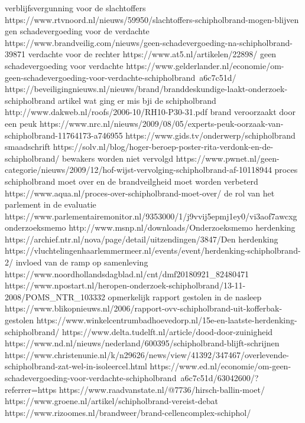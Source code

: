verblijfsvergunning voor de slachtoffers
https://www.rtvnoord.nl/nieuws/59950/slachtoffers-schipholbrand-mogen-blijven
gen schadevergoeding voor de verdachte
https://www.brandveilig.com/nieuws/geen-schadevergoeding-na-schipholbrand-39871
verdachte voor de rechter
https://www.at5.nl/artikelen/22898/
geen schadevergoeding voor verdachte
https://www.gelderlander.nl/economie/om-geen-schadevergoeding-voor-verdachte-schipholbrand~a6c7c51d/
https://beveiligingnieuws.nl/nieuws/brand/branddeskundige-laakt-onderzoek-schipholbrand
artikel wat ging er mis bji de schipholbrand
http://www.dakweb.nl/roofs/2006-10/RH10-P30-31.pdf
brand veroorzaakt door een peuk
https://www.nrc.nl/nieuws/2009/08/05/experts-peuk-oorzaak-van-schipholbrand-11764173-a746955
https://www.gids.tv/onderwerp/schipholbrand
smaadschrift
https://solv.nl/blog/hoger-beroep-poster-rita-verdonk-en-de-schipholbrand/
bewakers worden niet vervolgd
https://www.pwnet.nl/geen-categorie/nieuws/2009/12/hof-wijst-vervolging-schipholbrand-af-10118944
proces schipholbrand moet over en de brandveilgheid moet worden verbeterd
https://www.aqua.nl/proces-over-schipholbrand-moet-over/
de rol van het parlement in de evaluatie
https://www.parlementairemonitor.nl/9353000/1/j9vvij5epmj1ey0/vi3aof7awcxg
onderzoeksmemo
http://www.msnp.nl/downloads/Onderzoeksmemo%
herdenking
https://archief.ntr.nl/nova/page/detail/uitzendingen/3847/Den%
herdenking
https://vluchtelingenhaarlemmermeer.nl/events/event/herdenking-schipholbrand-2/
invloed van de ramp op samenleving
https://www.noordhollandsdagblad.nl/cnt/dmf20180921_82480471
https://www.npostart.nl/heropen-onderzoek-schipholbrand/13-11-2008/POMS_NTR_103332
opmerkelijk rapport gestolen in de nasleep
https://www.blikopnieuws.nl/2006/rapport-ovv-schipholbrand-uit-kofferbak-gestolen
https://www.winkelcentrumbadhoevedorp.nl/15e-en-laatste-herdenking-schipholbrand/
https://www.delta.tudelft.nl/article/dood-door-zuinigheid
https://www.nd.nl/nieuws/nederland/600395/schipholbrand-blijft-schrijnen
https://www.christenunie.nl/k/n29626/news/view/41392/347467/overlevende-schipholbrand-zat-wel-in-isoleercel.html
https://www.ed.nl/economie/om-geen-schadevergoeding-voor-verdachte-schipholbrand~a6c7c51d/63042600/?referrer=https%
https://www.raadvanstate.nl/@7736/hirsch-ballin-moet/
https://www.groene.nl/artikel/schipholbrand-vereist-debat
https://www.rizoomes.nl/brandweer/brand-cellencomplex-schiphol/



